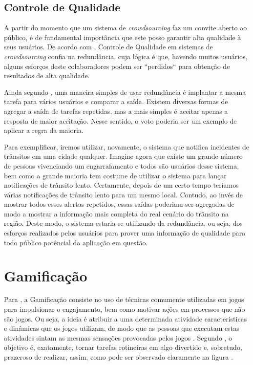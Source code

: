 \subsection{Controle de Qualidade}

A partir do momento que um sistema de \textit{crowdsourcing} faz um convite aberto ao público, é de fundamental importância que este posso garantir alta qualidade à seus usuários. De acordo com \cite{Hu2012}, Controle de Qualidade em sistemas de \textit{crowdsourcing}  confia na redundância, cuja lógica é que, havendo muitos usuários, alguns esforços deste colaboradores podem ser “perdidos“ para obtenção de resultados de alta qualidade.
	
Ainda segundo \cite{Hu2012}, uma maneira simples de usar redundância é implantar a mesma tarefa para vários usuários e comparar a saída. Existem diversas formas de agregar a saída de tarefas repetidas, mas a mais simples é aceitar apenas a resposta de maior aceitação. Nesse sentido, o voto poderia ser um exemplo de aplicar a regra da maioria.
	
Para exemplificar, iremos utilizar, novamente,  o sistema que notifica incidentes de trânsitos em uma cidade qualquer. Imagine agora que existe um grande número de pessoas vivenciando um engarrafamento e todos são usuários desse sistema, bem como a grande maioria tem costume de utilizar o sistema para lançar notificações de trânsito lento. Certamente, depois de um certo tempo teríamos várias notificações de trânsito lento para um mesmo local. Contudo, ao invés de mostrar todos esses alertas repetidos, essas saídas poderiam ser agregadas de modo a mostrar a informação mais completa do real cenário do trânsito na região. Deste modo, o sistema estaria se utilizando da redundância, ou seja, dos esforços realizados pelos usuários para prover uma informação de qualidade para todo público potêncial da aplicação em questão.  

\section{Gamificação}
Para \cite{deterding2011}, a Gamificação consiste no uso de técnicas comumente utilizadas em jogos para impulsionar o engajamento, bem como motivar ações em processos que não são jogos. Ou seja, a ideia é atribuir a uma determinada atividade características e dinâmicas que os jogos utilizam, de modo que as pessoas que executam estas atividades sintam as mesmas sensações  provocadas pelos jogos \citep{pereira2011}. Segundo \cite{duggan2013}, o objetivo é, exatamente, tornar tarefas rotineiras em algo divertido e, sobretudo, prazeroso de realizar, assim, como pode ser observado claramente na figura . 

